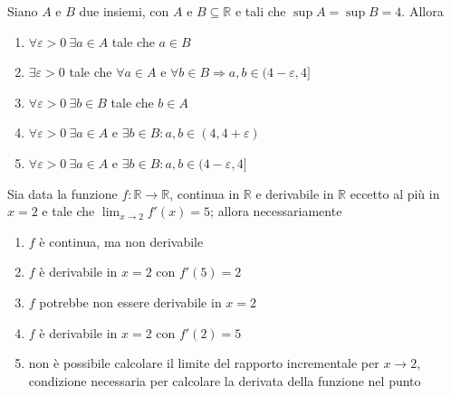 \begin{quiz}
Siano $A$ e $B$ due insiemi, con $A$ e $B\subseteq\mathbb R$ e tali che $\sup A=\sup B=4$. Allora
\begin{enumerate}
\item $\forall\varepsilon>0\ \exists a\in A$ tale che $a\in B$
\item $\exists\varepsilon>0$ tale che $\forall a\in A$ e $\forall b\in B\Rightarrow a,b\in(4-\varepsilon,4]$
\item $\forall\varepsilon>0\ \exists b\in B$ tale che $b\in A$
\item $\forall\varepsilon>0\ \exists a\in A$ e $\exists b\in B: a,b\in(4,4+\varepsilon)$
\item $\forall\varepsilon>0\ \exists a\in A$ e $\exists b\in B: a,b\in(4-\varepsilon,4]$
\end{enumerate}
\end{quiz}

\begin{quiz}
Sia data la funzione $f:\mathbb R\to\mathbb R$, continua in $\mathbb R$ e derivabile in $\mathbb R$ eccetto al pi\`u in $x=2$ e tale che $\lim_{x\to2}f\prime(x)=5$; allora necessariamente
\begin{enumerate}
\item $f$ \`e continua, ma non derivabile
\item $f$ \`e derivabile in $x=2$ con $f\prime(5)=2$
\item $f$ potrebbe non essere derivabile in $x=2$
\item $f$ \`e derivabile in $x=2$ con $f\prime(2)=5$
\item non \`e possibile calcolare il limite del rapporto incrementale per $x\to2$, condizione necessaria per calcolare la derivata della funzione nel punto
\end{enumerate}
\end{quiz}

